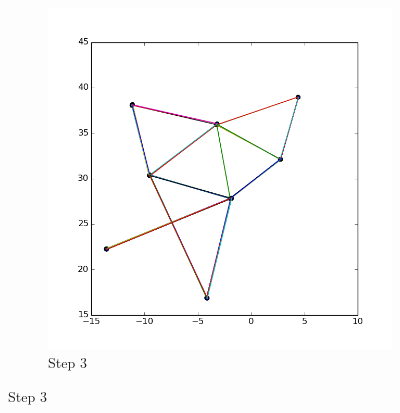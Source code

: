 \documentclass[12pt,a4paper]{article}
\begin{document}
\begin{figure}
\begin{minipage}[0.2\textheight]{\textwidth}
\begin{subfigure}{0.5\textwidth}
            \includegraphics[scale=0.4]{results_Harel/rand01/HK_step3_eps01.png}
            \caption{Step $3$}
     \end{subfigure}        
\end{minipage}


\end{figure}
\end{document}
